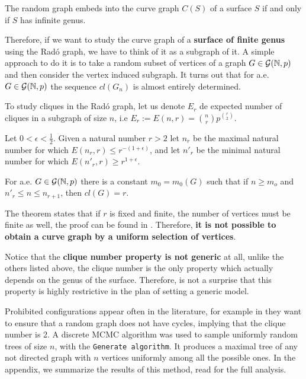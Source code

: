 \begin{theorem}\label{beringAndGaster}
The random graph embeds into the curve graph $C(S)$ of a surface $S$ if and only if $S$ has infinite genus.
\end{theorem}

Therefore, if we want to study the curve graph of a \textbf{surface of finite genus} using the Radó graph, we have to think of it as a subgraph of it. A simple approach to do it is to take a random subset of vertices of a graph $G\in \mathcal{G}(\mathbb{N}, p)$ and then consider the vertex induced subgraph. It turns out that for a.e. $G\in \mathcal{G}(\mathbb{N}, p)$ the sequence $cl(G_n)$ is almost entirely determined.

To study cliques in the Radó graph, let us denote $E_{r}$ de expected number of cliques in a subgraph of size $n$, i.e $E_{r} := E(n,r) = \binom{n}{r}p^{\binom{r}{2}}.$

Let $0 < \epsilon < \frac{1}{2}$. Given a natural number $r > 2$ let $n_{r}$ be the maximal natural number for which $E(n_{r}, r) \leq r^{-(1+\epsilon)}$, and let $n'_{r}$ be the minimal natural number for which $E(n'_{r}, r)\geq r^{1+\epsilon}.$ 

\begin{theorem}
For a.e. $G \in \mathcal{G}(\mathbb{N},p)$ there is a constant $m_{0} = m_{0}(G)$ such that if $n \geq m_o$ and $n'_{r} \leq n \leq n_{r+1}$, then $cl(G) = r$.
\end{theorem}

The theorem states that if $r$ is fixed and finite, the number of vertices must be finite as well, the proof can be found in \cite[Bollobás p.~284]{Bollobas}. Therefore, \textbf{it is not possible to obtain a curve graph by a uniform selection of vertices}.

Notice that the \textbf{clique number property is not generic} at all, unlike the others listed above, the clique number is the only property which actually depends on the genus of the surface. Therefore, is not a surprise that this property is highly restrictive in the plan of setting a generic model.

Prohibited configurations appear often in the literature, for example in \cite[Alcazar 15]{Alcazar15} they want to ensure that a random graph does not have cycles, implying that the clique number is 2. A discrete MCMC algorithm was used to sample uniformly random trees of size $n$, with the \texttt{Generate algorithm}. It produces a maximal tree of any not directed graph with $n$ vertices uniformly among all the possible ones. In the appendix, we summarize the results of this method, read \cite[Broder 89]{Broder89} for the full analysis.

